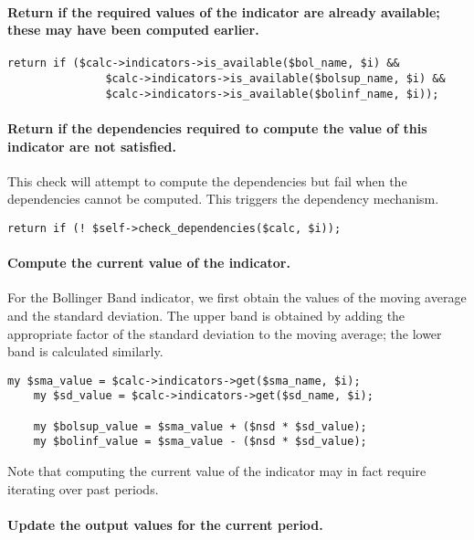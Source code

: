 \documentclass[11pt,twoside]{article}
\begin{document}
\paragraph{Return if the required values of the indicator are already available; these may have been computed earlier.}

\begin{lstlisting}[name=example]
    return if ($calc->indicators->is_available($bol_name, $i) &&
               $calc->indicators->is_available($bolsup_name, $i) &&
               $calc->indicators->is_available($bolinf_name, $i));
\end{lstlisting}

\paragraph{Return if the dependencies required to compute the value of this
indicator are not satisfied.}

This check will attempt to compute the
dependencies but fail when the dependencies cannot be computed. This
triggers the dependency mechanism.

\begin{lstlisting}[name=example]
    return if (! $self->check_dependencies($calc, $i));

\end{lstlisting}

\paragraph{Compute the current value of the indicator.}

For the Bollinger Band indicator, we first obtain the values of the
moving average and the standard deviation. The upper band is obtained
by adding the appropriate factor of the standard deviation to the
moving average; the lower band is calculated similarly.

\begin{lstlisting}[name=example]
    my $sma_value = $calc->indicators->get($sma_name, $i);
    my $sd_value = $calc->indicators->get($sd_name, $i);

    my $bolsup_value = $sma_value + ($nsd * $sd_value);
    my $bolinf_value = $sma_value - ($nsd * $sd_value);

\end{lstlisting}
Note that computing the current value of the indicator may in fact
require iterating over past periods.

\paragraph{Update the output values for the current period.}
\end{document}
